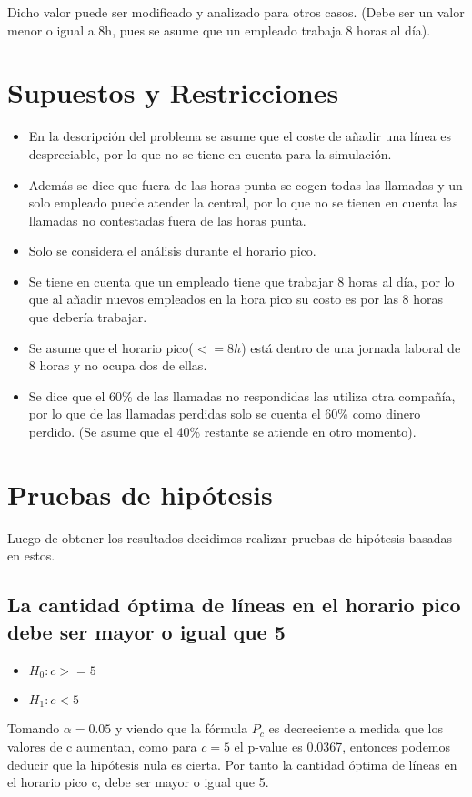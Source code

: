 \documentclass{article}
\begin{document}
Dicho valor puede ser modificado y analizado para otros casos. (Debe ser un valor menor o igual a 8h, pues se asume que un empleado trabaja 8 horas al día).

\section{Supuestos y Restricciones}
\begin{itemize}
    \item En la descripción del problema se asume que el coste de añadir una línea es despreciable, por lo que no se tiene en cuenta para la simulación.
    \item Además se dice que fuera de las horas punta se cogen todas las llamadas y un solo empleado puede atender la central, por lo que no se tienen en cuenta las llamadas no contestadas fuera de las horas punta. 
    \item Solo se considera el análisis durante el horario pico.
    \item Se tiene en cuenta que un empleado tiene que trabajar 8 horas al día, por lo que al añadir nuevos empleados en la hora pico su costo es por las 8 horas que debería trabajar.
    \item Se asume que el horario pico($<=8h$) está dentro de una jornada laboral de 8 horas y no ocupa dos de ellas.
    \item Se dice que el 60\% de las llamadas no respondidas las utiliza otra compañía, por lo que de las llamadas perdidas solo se cuenta el 60\% como dinero perdido. (Se asume que el 40\% restante se atiende en otro momento).
\end{itemize}

\section{Pruebas de hipótesis}
Luego de obtener los resultados decidimos realizar pruebas de hipótesis basadas en estos.

\subsection{La cantidad óptima de líneas en el horario pico debe ser mayor o igual que 5}
\begin{itemize}
    \item $H_0: c >= 5$
    \item $H_1: c < 5$
\end{itemize}

Tomando $\alpha = 0.05$ y viendo que la fórmula $P_c$ es decreciente a medida que los valores de c aumentan, como para $c = 5$ el p-value es 0.0367, entonces podemos deducir que la hipótesis nula es cierta. Por tanto la cantidad óptima de líneas en el horario pico c, debe ser mayor o igual que 5.
\end{document}
